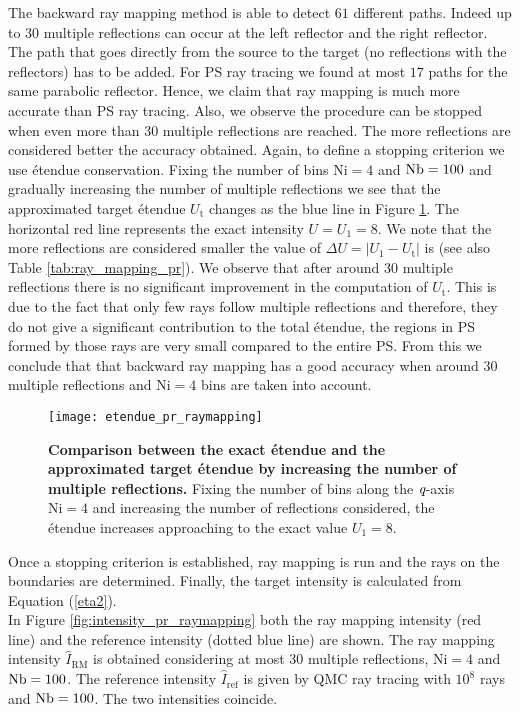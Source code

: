 The backward ray mapping method is able to detect $61$ different paths. Indeed up to $30$ multiple reflections can occur at the left reflector and the right reflector. The path that goes directly from the source to the target (no reflections with the reflectors) has to be added. For PS ray tracing we found at most $17$ paths for the same parabolic reflector. Hence, we claim that ray mapping is much more accurate than PS ray tracing. Also, we observe the procedure can be stopped when even more than $30$ multiple reflections are reached. The more reflections are considered better the accuracy obtained. Again, to define a stopping criterion we use \'{e}tendue conservation. Fixing the number of bins $\textrm{Ni}=4$ and $\textrm{Nb}=100$ and gradually increasing the number of multiple reflections we see that the approximated target \'{e}tendue $U_{\textrm{t}}$ changes as the blue line in Figure \ref{fig:etendue_pr_raymapping}. The horizontal red line represents the exact intensity $U = U_{1} = 8$. We note that the more reflections are considered smaller the value of $\Delta U = |U_1-U_{\textrm{t}}|$ is (see also Table \ref{tab:ray_mapping_pr}). We observe that after around $30$ multiple reflections there is no significant improvement in the computation of $U_{\textrm{t}}$. This is due to the fact that only few rays follow multiple reflections and therefore, they do not give a significant contribution to the total \'{e}tendue, the regions in PS formed by those rays are very small compared to the entire PS. From this we conclude that that backward ray mapping has a good accuracy when around $30$ multiple reflections and $\textrm{Ni}=4$ bins are taken into account.
\begin{figure}[h]
  \begin{center}
  \texttt{[image: etendue\_pr\_raymapping]}
  \end{center}
  \caption{\textbf{Comparison between the exact \'{e}tendue and the approximated target \'{e}tendue by increasing the number of multiple reflections.}
Fixing the number of bins along the $\textit{q}$-axis $\textrm{Ni}=4$ and increasing the number of reflections considered, the \'{e}tendue increases approaching to the exact value $U_1=8$.}
\label{fig:etendue_pr_raymapping}
 \end{figure}
Once a stopping criterion is established, ray mapping is run and the rays on the boundaries are determined. Finally, the target intensity is calculated from Equation (\ref{eta2}). 
\\ \indent In Figure \ref{fig:intensity_pr_raymapping} both the ray mapping intensity (red line) and the reference intensity (dotted blue line) are shown. The ray mapping intensity $\hat{I}_{\textrm{RM}}$ is obtained considering at most $30$ multiple reflections, $\textrm{Ni}=4$ and $\textrm{Nb} = 100$. The reference intensity $\hat{I}_{\textrm{ref}}$ is given by QMC ray tracing with $10^8$ rays and $\textrm{Nb} = 100$. The two intensities coincide.
